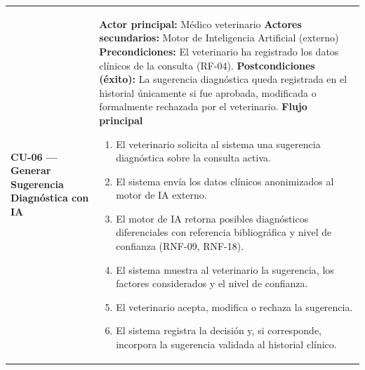 \documentclass[
]{article}
\newcounter{none} %
\begin{document}
{\def\LTcaptype{none} %
\begin{longtable}[]{|
  >{\raggedright\arraybackslash}p{}|
  >{\raggedright\arraybackslash}p{}|}
\hline
\begin{minipage}[b]{\linewidth}\raggedright
\textbf{CU-06 --- Generar Sugerencia Diagnóstica con IA}
\end{minipage} & \begin{minipage}[b]{\linewidth}\raggedright
\textbf{Actor principal:} Médico veterinario \textbf{Actores
secundarios:} Motor de Inteligencia Artificial (externo)
\textbf{Precondiciones:} El veterinario ha registrado los datos clínicos
de la consulta (RF-04). \textbf{Postcondiciones (éxito):} La sugerencia diagnóstica queda
registrada en el historial únicamente si fue aprobada, modificada o
formalmente rechazada por el veterinario. \textbf{Flujo principal}

\begin{enumerate}
\def\labelenumi{\arabic{enumi}.}
\item
  El veterinario solicita al sistema una sugerencia diagnóstica sobre la
  consulta activa.
\item
  El sistema envía los datos clínicos anonimizados al motor de IA
  externo.
\item
  El motor de IA retorna posibles diagnósticos diferenciales con
  referencia bibliográfica y nivel de confianza (RNF-09, RNF-18).
\item
  El sistema muestra al veterinario la sugerencia, los factores
  considerados y el nivel de confianza.
\item
  El veterinario acepta, modifica o rechaza la sugerencia.
\item
  El sistema registra la decisión y, si corresponde, incorpora la
  sugerencia validada al historial clínico.
\end{enumerate}


\end{minipage}
\end{longtable}}
\end{document}
